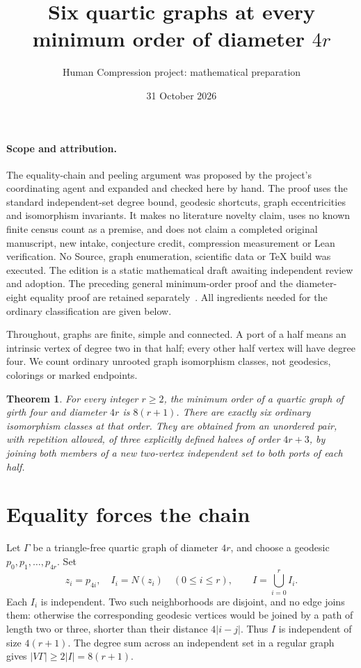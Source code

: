 \documentclass[11pt]{article}
\title{Six quartic graphs at every minimum order of diameter $4r$}
\author{Human Compression project: mathematical preparation}
\date{31 October 2026}
\newtheorem{theorem}{Theorem}[section]
\theoremstyle{definition}\newtheorem{definition}[theorem]{Definition}
\begin{document}
\maketitle

\paragraph{Scope and attribution.}
The equality-chain and peeling argument was proposed by the project's
coordinating agent and expanded and checked here by hand. The proof
uses the standard independent-set degree bound, geodesic shortcuts,
graph eccentricities and isomorphism invariants. It makes no literature
novelty claim, uses no known finite census count as a premise, and
does not claim a completed original manuscript, new intake, conjecture
credit, compression measurement or Lean verification. No Source,
graph enumeration, scientific data or TeX build was executed. The
edition is a static mathematical draft awaiting independent review
and adoption. The preceding general minimum-order proof and the
diameter-eight equality proof are retained separately~\cite{general,eight}.
All ingredients needed for the ordinary classification are given below.

Throughout, graphs are finite, simple and connected. A port of a
half means an intrinsic vertex of degree two in that half; every
other half vertex will have degree four. We count ordinary unrooted
graph isomorphism classes, not geodesics, colorings or marked endpoints.

\begin{theorem}\label{main}
For every integer $r\geq2$, the minimum order of a quartic graph of
girth four and diameter $4r$ is $8(r+1)$. There are exactly six ordinary
isomorphism classes at that order. They are obtained from an unordered
pair, with repetition allowed, of three explicitly defined halves of
order $4r+3$, by joining both members of a new two-vertex independent
set to both ports of each half.
\end{theorem}

\section{Equality forces the chain}

Let $\Gamma$ be a triangle-free quartic graph of diameter $4r$,
and choose a geodesic $p_0,p_1,\ldots,p_{4r}$. Set
\[
 z_i=p_{4i},\quad I_i=N(z_i)\quad(0\leq i\leq r),
 \qquad I=\bigcup_{i=0}^r I_i.
\]
Each $I_i$ is independent. Two such neighborhoods are disjoint,
and no edge joins them: otherwise the corresponding geodesic vertices
would be joined by a path of length two or three, shorter than their
distance $4|i-j|$. Thus $I$ is independent of size $4(r+1)$.
The degree sum across an independent set in a regular graph gives
$|V\Gamma|\geq2|I|=8(r+1)$.
\end{document}
